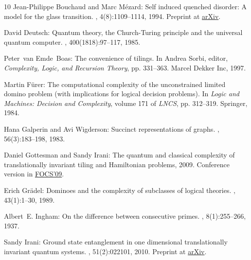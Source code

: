 \begin{thebibliography}{10}
{\sc Jean-Philippe Bouchaud and Marc M{\'e}zard}: Self induced quenched
  disorder: A model for the glass transition.
, 4(8):1109--1114, 1994.
\newblock Preprint at \href{http://arxiv.org/abs/cond-mat/9405075}{arXiv}.
\newblock [\epfmtdoi{10.1051/jp1:1994240}]

{\sc David {Deutsch}}: {Quantum theory, the Church-Turing principle and the
  universal quantum computer}.
, 400(1818):97--117,
  1985.

{\sc Peter~van Emde~Boas}: The convenience of tilings.
\newblock In {\sc Andrea Sorbi}, editor, {\em Complexity, Logic, and Recursion
  Theory}, pp. 331--363. Marcel Dekker Inc, 1997.

{\sc Martin F{\"u}rer}: The computational complexity of the unconstrained
  limited domino problem (with implications for logical decision problems).
\newblock In {\em Logic and Machines: Decision and Complexity}, volume 171 of
  {\em LNCS}, pp. 312--319. Springer, 1984.
\newblock [\epfmtdoi{10.1007/3-540-13331-3\_48}]

{\sc Hana Galperin and Avi Wigderson}: Succinct representations of graphs.
, 56(3):183--198, 1983.
\newblock [\epfmtdoi{10.1016/S0019-9958(83)80004-7}]

{\sc Daniel Gottesman and Sandy Irani}: The quantum and classical complexity of
  translationally invariant tiling and {H}amiltonian problems, 2009.
\newblock Conference version in
  \href{http://dx.doi.org/10.1109/FOCS.2009.22}{FOCS'09}.

{\sc Erich Gr{\"a}del}: Dominoes and the complexity of subclasses of logical
  theories.
, 43(1):1--30, 1989.
\newblock [\epfmtdoi{10.1016/0168-0072(89)90023-7}]

{\sc Albert~E. Ingham}: On the difference between consecutive primes.
,
  8(1):255--266, 1937.

{\sc Sandy Irani}: Ground state entanglement in one dimensional translationally
  invariant quantum systems.
, 51(2):022101, 2010.
\newblock Preprint at \href{http://arxiv.org/abs/0901.1107}{arXiv}.
\newblock [\epfmtdoi{10.1063/1.3254321}]


\end{thebibliography}
